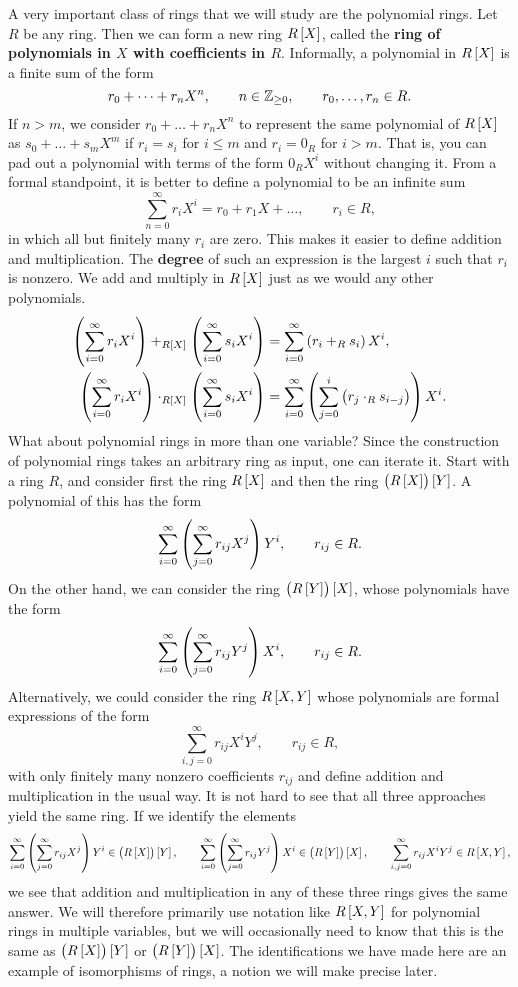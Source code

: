 A very important class of rings that we will study are the polynomial rings. Let $ R $ be any ring. Then we can form a new ring $ R\sbr{X} $, called the \textbf{ring of polynomials in $ X $ with coefficients in $ R $}. Informally, a polynomial in $ R\sbr{X} $ is a finite sum of the form
$$ r_0 + \dots + r_nX^n, \qquad n \in \mathbb{Z}_{\ge 0}, \qquad r_0, \dots, r_n \in R. $$
If $ n > m $, we consider $ r_0 + \dots + r_nX^n $ to represent the same polynomial of $ R\sbr{X} $ as $ s_0 + \dots + s_mX^m $ if $ r_i = s_i $ for $ i \le m $ and $ r_i = 0_R $ for $ i > m $. That is, you can pad out a polynomial with terms of the form $ 0_RX^i $ without changing it. From a formal standpoint, it is better to define a polynomial to be an infinite sum
$$ \sum_{n = 0}^\infty r_iX^i = r_0 + r_1X + \dots, \qquad r_i \in R, $$
in which all but finitely many $ r_i $ are zero. This makes it easier to define addition and multiplication. The \textbf{degree} of such an expression is the largest $ i $ such that $ r_i $ is nonzero. We add and multiply in $ R\sbr{X} $ just as we would any other polynomials.
\begin{align*}
\br{\sum_{i = 0}^\infty r_iX^i} +_{R\sbr{X}} \br{\sum_{i = 0}^\infty s_iX^i} & = \sum_{i = 0}^\infty \br{r_i +_R s_i} X^i, \\
\br{\sum_{i = 0}^\infty r_iX^i} \cdot_{R\sbr{X}} \br{\sum_{i = 0}^\infty s_iX^i} & = \sum_{i = 0}^\infty \br{\sum_{j = 0}^i \br{r_j \cdot_R s_{i - j}}} X^i.
\end{align*}
What about polynomial rings in more than one variable? Since the construction of polynomial rings takes an arbitrary ring as input, one can iterate it. Start with a ring $ R $, and consider first the ring $ R\sbr{X} $ and then the ring $ \br{R\sbr{X}}\sbr{Y} $. A polynomial of this has the form
$$ \sum_{i = 0}^\infty \br{\sum_{j = 0}^\infty r_{ij}X^j}Y^i, \qquad r_{ij} \in R. $$
On the other hand, we can consider the ring $ \br{R\sbr{Y}}\sbr{X} $, whose polynomials have the form
$$ \sum_{i = 0}^\infty \br{\sum_{j = 0}^\infty r_{ij}Y^j}X^i, \qquad r_{ij} \in R. $$
Alternatively, we could consider the ring $ R\sbr{X, Y} $ whose polynomials are formal expressions of the form
$$ \sum_{i, j = 0}^\infty r_{ij}X^iY^j, \qquad r_{ij} \in R, $$
with only finitely many nonzero coefficients $ r_{ij} $ and define addition and multiplication in the usual way. It is not hard to see that all three approaches yield the same ring. If we identify the elements
$$ \sum_{i = 0}^\infty \br{\sum_{j = 0}^\infty r_{ij}X^j}Y^i \in \br{R\sbr{X}}\sbr{Y}, \qquad \sum_{i = 0}^\infty \br{\sum_{j = 0}^\infty r_{ij}Y^j}X^i \in \br{R\sbr{Y}}\sbr{X}, \qquad \sum_{i, j = 0}^\infty r_{ij}X^iY^j \in R\sbr{X, Y}, $$
we see that addition and multiplication in any of these three rings gives the same answer. We will therefore primarily use notation like $ R\sbr{X, Y} $ for polynomial rings in multiple variables, but we will occasionally need to know that this is the same as $ \br{R\sbr{X}}\sbr{Y} $ or $ \br{R\sbr{Y}}\sbr{X} $. The identifications we have made here are an example of isomorphisms of rings, a notion we will make precise later.

